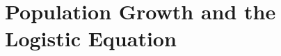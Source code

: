 \section{Population Growth and the Logistic Equation} 
\label{S:7.6.Logistic}



\newpage



\newpage



\newpage

\clearpage
